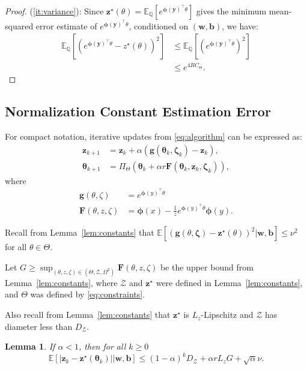 \documentclass[twoside]{article}
\newtheorem{lemma}{Lemma}
\theoremstyle{definition}
\newcommand{\E}{\mathbb{E}}
\newcommand{\Q}{\mathbb{Q}}
\newcommand{\mb}{\mathbf}
\newcommand{\cZ}{\mathcal{Z}}
\newcommand{\1}[1]{\scalebox{1.25}{$\mathds{1}$}\left[#1\right]}
\begin{document}
\begin{proof}
(\ref{it:variance}):
Since $\bm{z}^\star(\theta)=\E_{\Q}[e^{\bm{\phi}(\bm{y})^\top\theta}]$ gives the minimum mean-squared error estimate of $e^{\bm{\phi}(\bm{y})^\top \theta}$, conditioned on $(\bm{w},\bm{b})$, we have:
\begin{align*}
\E_{\Q}\left[\left(e^{\bm{\phi}(\bm{y})^\top\theta} -z^\star(\theta)\right)^2\right] &\le 
\E_{\Q}\left[\left(e^{\bm{\phi}(\bm{y})^\top\theta}\right)^2\right] \\
&\le e^{4RC_{\Theta}}  .
\end{align*}
\end{proof}



\subsection{Normalization Constant Estimation Error}
\label{appss:normalization}
For compact notation, iterative updates from \eqref{eq:algorithm} can be expressed as:
\begin{align*}
    \mb{z}_{k+1} &= \mb{z}_k + \alpha(\bm{g}(\bm{\theta}_k, \bm{\zeta}_k) - \mb{z}_k), \\
    \bm{\theta}_{k+1} &= \Pi_{\Theta}\left(\bm{\theta}_k + \alpha r \bm{F}(\bm{\theta}_k, \mb{z}_k, \bm{\zeta}_k)\right),
\end{align*}
where
\begin{align*}
\bm{g}(\theta,\zeta)&=e^{\bm{\phi}(y)^\top\theta} \\
\bm{F}(\theta,z,\zeta)&=\bm{\phi}(x)-\frac{1}{z}e^{\bm{\phi}(y)^\top \theta} \bm{\phi}(y).
\end{align*}

Recall from Lemma~\ref{lem:constants} that $\E[(\bm{g}(\theta,\bm{\zeta})-\bm{z}^\star(\theta))^2|\bm{w},\bm{b}]\le \nu^2$ for all $\theta\in\Theta$. 


Let $G\ge \sup_{(\theta,z,\zeta)\in (\Theta,\cZ,\Omega^2)}\bm{F}(\theta,z,\zeta)$ be the upper bound from Lemma~\ref{lem:constants}, where $\cZ$ and $\bm{z}^\star$ were defined in Lemma~\ref{lem:constants}, and $\Theta$ was defined by \eqref{eq:constraints}.

Also recall from Lemma~\ref{lem:constants} that $\bm{z}^\star$ is $L_z$-Lipschitz and $\cZ$ has diameter less than $D_{\cZ}$.

\begin{lemma}
\label{lem:zError}
If $\alpha< 1$, then for all $k\ge 0$
$$
\E[|\bm{z}_k-\bm{z}^\star(\bm{\theta}_k)||\bm{w},\bm{b}]\le 
(1-\alpha)^{k}D_{\cZ} + \alpha r L_z G + \sqrt{\alpha} \nu. 
$$
\end{lemma}
\end{document}
